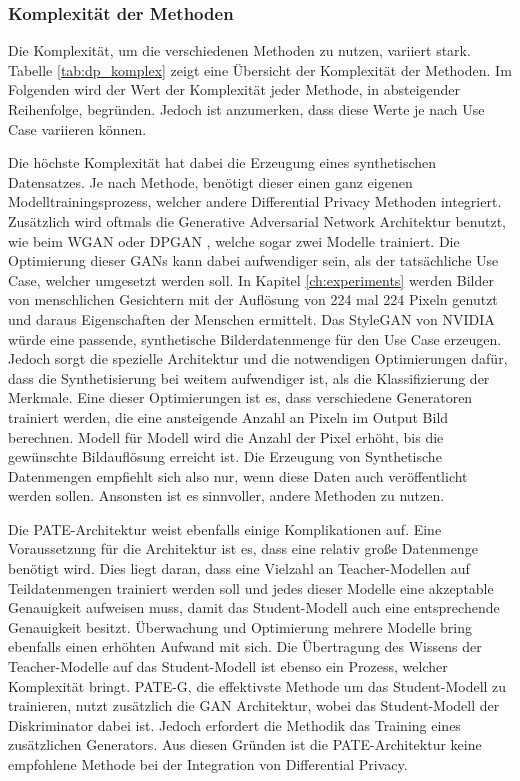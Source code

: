 \subsubsection*{Komplexität der Methoden}

Die Komplexität, um die verschiedenen Methoden zu nutzen, variiert stark.
Tabelle \ref{tab:dp_komplex} zeigt eine Übersicht der Komplexität der Methoden.
Im Folgenden wird der Wert der Komplexität jeder Methode, in absteigender Reihenfolge, begründen.
Jedoch ist anzumerken, dass diese Werte je nach Use Case variieren können.


Die höchste Komplexität hat dabei die Erzeugung eines synthetischen Datensatzes.
Je nach Methode, benötigt dieser einen ganz eigenen Modelltrainingsprozess, welcher andere Differential Privacy Methoden integriert.
Zusätzlich wird oftmals die Generative Adversarial Network Architektur benutzt, wie \zB beim WGAN \cite{P-92} oder DPGAN \cite{P-70}, welche sogar zwei Modelle trainiert.
Die Optimierung dieser GANs kann dabei aufwendiger sein, als der tatsächliche Use Case, welcher umgesetzt werden soll. 
In Kapitel \ref{ch:experiments} werden Bilder von menschlichen Gesichtern mit der Auflösung von 224 mal 224 Pixeln genutzt und daraus Eigenschaften der Menschen ermittelt. 
Das StyleGAN von NVIDIA \cite{P-108} würde eine passende, synthetische Bilderdatenmenge für den Use Case erzeugen.
Jedoch sorgt die spezielle Architektur und die notwendigen Optimierungen dafür, dass die Synthetisierung bei weitem aufwendiger ist, als die Klassifizierung der Merkmale.
Eine dieser Optimierungen ist es, dass verschiedene Generatoren trainiert werden, die eine ansteigende Anzahl an Pixeln im Output Bild berechnen.
Modell für Modell wird die Anzahl der Pixel erhöht, bis die gewünschte Bildauflösung erreicht ist.
Die Erzeugung von Synthetische Datenmengen empfiehlt sich also nur, wenn diese Daten auch veröffentlicht werden sollen.
Ansonsten ist es sinnvoller, andere Methoden zu nutzen.

Die PATE-Architektur \cite{P-57} weist ebenfalls einige Komplikationen auf.
Eine Voraussetzung für die Architektur ist es, dass eine relativ große Datenmenge benötigt wird. 
Dies liegt daran, dass eine Vielzahl an Teacher-Modellen auf Teildatenmengen trainiert werden soll und jedes dieser Modelle eine akzeptable Genauigkeit aufweisen muss, damit das Student-Modell auch eine entsprechende Genauigkeit besitzt.
Überwachung und Optimierung mehrere Modelle bring ebenfalls einen erhöhten Aufwand mit sich.
Die Übertragung des Wissens der Teacher-Modelle auf das Student-Modell ist ebenso ein Prozess, welcher Komplexität bringt.
PATE-G, die effektivste Methode um das Student-Modell zu trainieren, nutzt zusätzlich die GAN Architektur, wobei das Student-Modell der Diskriminator dabei ist.
Jedoch erfordert die Methodik das Training eines zusätzlichen Generators.
Aus diesen Gründen ist die PATE-Architektur keine empfohlene Methode bei der Integration von Differential Privacy.

